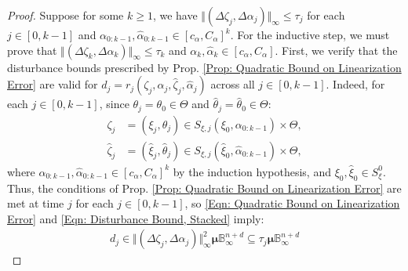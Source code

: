 \documentclass[letterpaper, 10 pt, conference]{ieeeconf}
\newcommand{\?}{\stackrel{?}{=}}
\newcommand{\param}{\theta}
\newcommand{\paramDim}{d}
\newcommand{\paramSet}{\Theta}
\newcommand{\var}{\xi}
\newcommand{\varDim}{n}
\newcommand{\varNominal}{\hat\var}
\newcommand{\paramNominal}{\hat\param}
\newcommand{\ratePGDNominal}{\hat\ratePGD}
\newcommand{\ratePGDError}{\Delta\ratePGD}
\newcommand{\ballUnit}{\mathbb{B}}
\newcommand{\linearizationError}{r}
\newcommand{\disturbance}{d}
\newcommand{\ratePGD}{\alpha}
\newcommand{\ratePGDMin}{c_\ratePGD}
\newcommand{\ratePGDMax}{C_\ratePGD}
\newcommand{\state}{\zeta}
\newcommand{\stateNominal}{\hat\state}
\newcommand{\stateError}{\Delta\state}
\newcommand{\tubeSize}{\tau}
\newcommand{\varInitialSet}{S_\var^0}
\newcommand{\hessianBoundStacked}{\boldsymbol{\mu}}
\newcommand{\varForwardReachableSet}[1]{S_{\var, {#1}}}
\begin{document}
\begin{proof}
Suppose for some $k \geq 1$, we have $\Vert (\stateError_j, \ratePGDError_j) \Vert_\infty \leq \tubeSize_j$ for each $j \in [0, k-1]$ and $\ratePGD_{0:k-1}, \ratePGDNominal_{0:k-1} \in [\ratePGDMin, \ratePGDMax]^k$.
For the inductive step, we must prove that $\Vert (\stateError_k, \ratePGDError_k) \Vert_\infty \leq \tubeSize_k$ and $\ratePGD_k, \ratePGDNominal_k \in [\ratePGDMin, \ratePGDMax]$. 
First, we verify that the disturbance bounds prescribed by Prop. \ref{Prop: Quadratic Bound on Linearization Error} are valid for $\disturbance_j = \linearizationError_j(\state_j, \ratePGD_j, \stateNominal_j, \ratePGDNominal_j)$ across all $j \in [0, k-1]$.
Indeed, for each $j \in [0, k-1]$, since $\param_j = \param_0 \in \paramSet$ and $\paramNominal_j = \paramNominal_0 \in \paramSet$:
{
\setlength{\abovedisplayskip}{3.5pt}
\setlength{\belowdisplayskip}{3.5pt}
\begin{subequations}
\begin{align}
    \state_j &= (\var_j, \param_j) \in \varForwardReachableSet{j}(\var_0, \ratePGD_{0:k-1}) \times \paramSet, \\
    \stateNominal_j &= (\varNominal_j, \paramNominal_j) \in \varForwardReachableSet{j}(\varNominal_0, \ratePGDNominal_{0:k-1}) \times \paramSet,
\end{align}
\end{subequations}
}
\hspace{-1mm}where $\ratePGD_{0:k-1}, \ratePGDNominal_{0:k-1} \in [\ratePGDMin, \ratePGDMax]^k$ by the induction hypothesis, and $\var_0, \varNominal_0 \in \varInitialSet$.
Thus, the conditions of Prop. \ref{Prop: Quadratic Bound on Linearization Error} are met at time $j$ for each $j \in [0, k-1]$, so 
\eqref{Eqn: Quadratic Bound on Linearization Error} and \eqref{Eqn: Disturbance Bound, Stacked} imply:
{
\setlength{\abovedisplayskip}{3.5pt}
\setlength{\belowdisplayskip}{3.5pt}
\begin{align}
\label{Eqn: Applying Disturbance Bound, Stacked}
    \disturbance_j 
    \in \Vert (\stateError_j, \ratePGDError_j) \Vert_\infty^2 \hessianBoundStacked \ballUnit_\infty^{\varDim + \paramDim} 
    \subseteq \tubeSize_j \hessianBoundStacked \ballUnit_\infty^{\varDim + \paramDim}
\end{align}
}
\end{proof}
\end{document}
